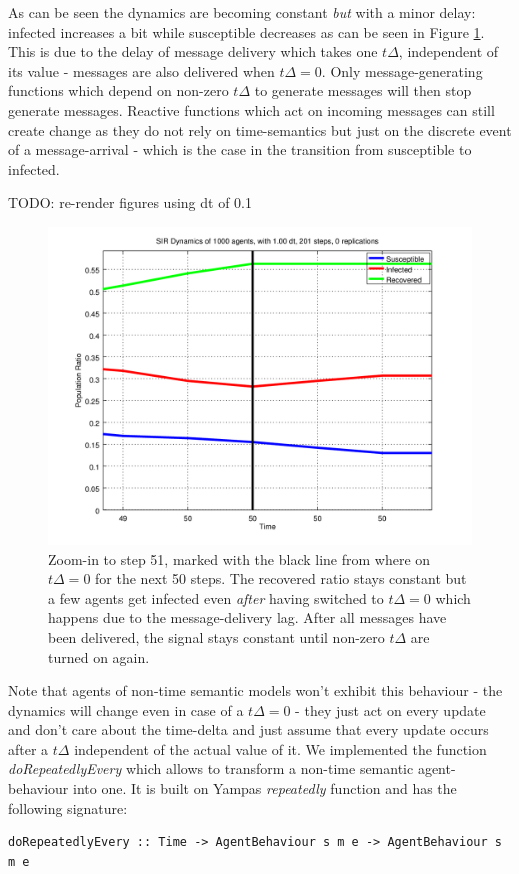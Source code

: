 As can be seen  the dynamics are becoming constant \textit{but} with a minor delay: infected increases a bit while susceptible decreases as can be seen in Figure \ref{fig:sir_abs_zero_dt_zoom}. This is due to the delay of message delivery which takes one $t\Delta$, independent of its value - messages are also delivered when $t\Delta = 0$. Only message-generating functions which depend on non-zero $t\Delta$ to generate messages will then stop generate messages. Reactive functions which act on incoming messages can still create change as they do not rely on time-semantics but just on the discrete event of a message-arrival - which is the case in the transition from susceptible to infected.

TODO: re-render figures using dt of 0.1

\begin{figure}
	\centering
	\includegraphics[width=.4\textwidth, angle=0]{./../shared/fig/dtzero/SIR_ABS_zeroDt_mid_zoom.png}
	\caption{Zoom-in to step 51, marked with the black line from where on $t\Delta = 0$ for the next 50 steps. The recovered ratio stays constant but a few agents get infected even \textit{after} having switched to $t\Delta = 0$ which happens due to the message-delivery lag. After all messages have been delivered, the signal stays constant until non-zero $t\Delta$ are turned on again.}
	\label{fig:sir_abs_zero_dt_zoom}
\end{figure}

Note that agents of non-time semantic models won't exhibit this behaviour - the dynamics will change even in case of a $t\Delta = 0$ - they just act on every update and don't care about the time-delta and just assume that every update occurs after a $t\Delta$ independent of the actual value of it. We implemented the function \textit{doRepeatedlyEvery} which allows to transform a non-time semantic agent-behaviour into one. It is built on Yampas \textit{repeatedly} function and has the following signature:

\begin{verbatim}
doRepeatedlyEvery :: Time -> AgentBehaviour s m e -> AgentBehaviour s m e
\end{verbatim}

